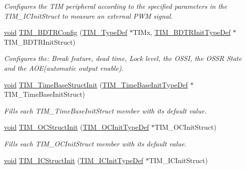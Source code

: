 \begin{DoxyCompactItemize}
\begin{DoxyCompactList}\small\item\em Configures the T\+IM peripheral according to the specified parameters in the T\+I\+M\+\_\+\+I\+C\+Init\+Struct to measure an external P\+WM signal. \end{DoxyCompactList}\item 
\hyperlink{usb__devapi_8h_afabf60e7f57651d6d595a02c75f07cd0}{void} \hyperlink{group___t_i_m___exported___functions_ga3df4ba3f0727f63ce621e2b2e6035d4f}{T\+I\+M\+\_\+\+B\+D\+T\+R\+Config} (\hyperlink{struct_t_i_m___type_def}{T\+I\+M\+\_\+\+Type\+Def} $\ast$T\+I\+Mx, \hyperlink{struct_t_i_m___b_d_t_r_init_type_def}{T\+I\+M\+\_\+\+B\+D\+T\+R\+Init\+Type\+Def} $\ast$T\+I\+M\+\_\+\+B\+D\+T\+R\+Init\+Struct)
\begin{DoxyCompactList}\small\item\em Configures the\+: Break feature, dead time, Lock level, the O\+S\+SI, the O\+S\+SR State and the A\+O\+E(automatic output enable). \end{DoxyCompactList}\item 
\hyperlink{usb__devapi_8h_afabf60e7f57651d6d595a02c75f07cd0}{void} \hyperlink{group___t_i_m___exported___functions_ga1556a0b9a5d53506875fd7de0cbc6b1f}{T\+I\+M\+\_\+\+Time\+Base\+Struct\+Init} (\hyperlink{struct_t_i_m___time_base_init_type_def}{T\+I\+M\+\_\+\+Time\+Base\+Init\+Type\+Def} $\ast$T\+I\+M\+\_\+\+Time\+Base\+Init\+Struct)
\begin{DoxyCompactList}\small\item\em Fills each T\+I\+M\+\_\+\+Time\+Base\+Init\+Struct member with its default value. \end{DoxyCompactList}\item 
\hyperlink{usb__devapi_8h_afabf60e7f57651d6d595a02c75f07cd0}{void} \hyperlink{group___t_i_m___exported___functions_ga394683c78ae02837882e36014e11643e}{T\+I\+M\+\_\+\+O\+C\+Struct\+Init} (\hyperlink{struct_t_i_m___o_c_init_type_def}{T\+I\+M\+\_\+\+O\+C\+Init\+Type\+Def} $\ast$T\+I\+M\+\_\+\+O\+C\+Init\+Struct)
\begin{DoxyCompactList}\small\item\em Fills each T\+I\+M\+\_\+\+O\+C\+Init\+Struct member with its default value. \end{DoxyCompactList}\item 
\hyperlink{usb__devapi_8h_afabf60e7f57651d6d595a02c75f07cd0}{void} \hyperlink{group___t_i_m___exported___functions_ga5005dac8e4e8a4c7fc2a0ef05b77cc50}{T\+I\+M\+\_\+\+I\+C\+Struct\+Init} (\hyperlink{struct_t_i_m___i_c_init_type_def}{T\+I\+M\+\_\+\+I\+C\+Init\+Type\+Def} $\ast$T\+I\+M\+\_\+\+I\+C\+Init\+Struct)

\end{DoxyCompactItemize}
